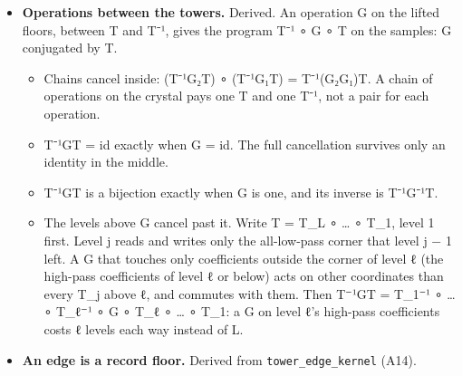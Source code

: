 \begin{itemize}
\begin{itemize}
\item keymath does not see the identity: T⁻¹ ∘ T emitted as steps runs every one of them.
\item In the proved program T is 69 steps (8 field steps and 61) and T⁻¹ is 60. F on the samples needs only the 8 field steps.
\item When the record holds the samples, F on the samples saves every step of T and T⁻¹.
\item When the record holds only the crystal, F ∘ T⁻¹ is the way down to the samples, and T⁻¹'s steps are its price.
\end{itemize}
\item \textbf{Operations between the towers.} Derived. An operation G on the lifted floors, between T and T⁻¹, gives the program T⁻¹ ∘ G ∘ T on the samples: G conjugated by T.

\begin{itemize}
\item Chains cancel inside: (T⁻¹G₂T) ∘ (T⁻¹G₁T) = T⁻¹(G₂G₁)T. A chain of operations on the crystal pays one T and one T⁻¹, not a pair for each operation.
\item T⁻¹GT = id exactly when G = id. The full cancellation survives only an identity in the middle.
\item T⁻¹GT is a bijection exactly when G is one, and its inverse is T⁻¹G⁻¹T.
\item The levels above G cancel past it. Write T = T\_\allowbreak{}L ∘ … ∘ T\_\allowbreak{}1, level 1 first. Level j reads and writes only the all-low-pass corner that level j − 1 left. A G that touches only coefficients outside the corner of level ℓ (the high-pass coefficients of level ℓ or below) acts on other coordinates than every T\_\allowbreak{}j above ℓ, and commutes with them. Then T⁻¹GT = T\_\allowbreak{}1⁻¹ ∘ … ∘ T\_\allowbreak{}ℓ⁻¹ ∘ G ∘ T\_\allowbreak{}ℓ ∘ … ∘ T\_\allowbreak{}1: a G on level ℓ's high-pass coefficients costs ℓ levels each way instead of L.
\end{itemize}
\item \textbf{An edge is a record floor.} Derived from \texttt{tower\_\allowbreak{}edge\_\allowbreak{}kernel} (A14).


\end{itemize}
